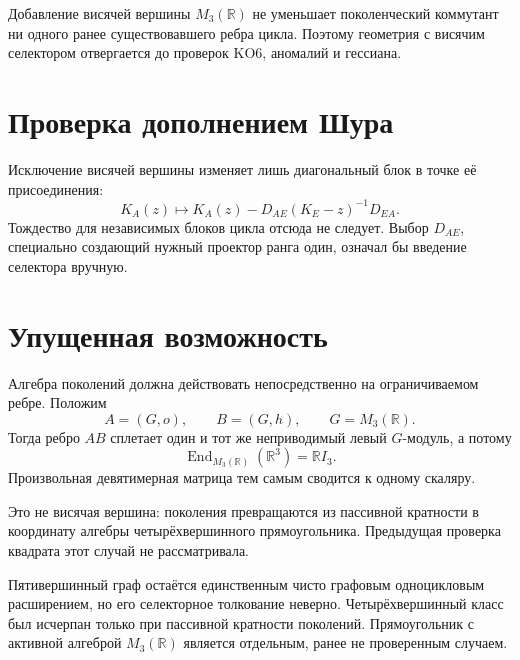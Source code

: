 \begin{theorem}
Добавление висячей вершины \(M_3(\mathbb R)\) не уменьшает поколенческий
коммутант ни одного ранее существовавшего ребра цикла. Поэтому геометрия с
висячим селектором отвергается до проверок KO6, аномалий и гессиана.
\end{theorem}

\section{Проверка дополнением Шура}

Исключение висячей вершины изменяет лишь диагональный блок в точке её
присоединения:
\begin{equation}
 K_A(z)\mapsto
 K_A(z)-D_{AE}(K_E-z)^{-1}D_{EA}.
\end{equation}
Тождество для независимых блоков цикла отсюда не следует. Выбор
\(D_{AE}\), специально создающий нужный проектор ранга один, означал бы
введение селектора вручную.

\section{Упущенная возможность}

Алгебра поколений должна действовать непосредственно на ограничиваемом
ребре. Положим
\begin{equation}
 A=(G,o),\qquad B=(G,h),
 \qquad G=M_3(\mathbb R).
\end{equation}
Тогда ребро \(AB\) сплетает один и тот же неприводимый левый \(G\)-модуль,
а потому
\begin{equation}
 \operatorname{End}_{M_3(\mathbb R)}(\mathbb R^3)=\mathbb R I_3.
\end{equation}
Произвольная девятимерная матрица тем самым сводится к одному скаляру.

Это не висячая вершина: поколения превращаются из пассивной кратности в
координату алгебры четырёхвершинного прямоугольника. Предыдущая проверка
квадрата этот случай не рассматривала.

\begin{proposition}
Пятивершинный граф остаётся единственным чисто графовым одноцикловым
расширением, но его селекторное толкование неверно. Четырёхвершинный класс
был исчерпан только при пассивной кратности поколений. Прямоугольник с
активной алгеброй \(M_3(\mathbb R)\) является отдельным, ранее не
проверенным случаем.
\end{proposition}

